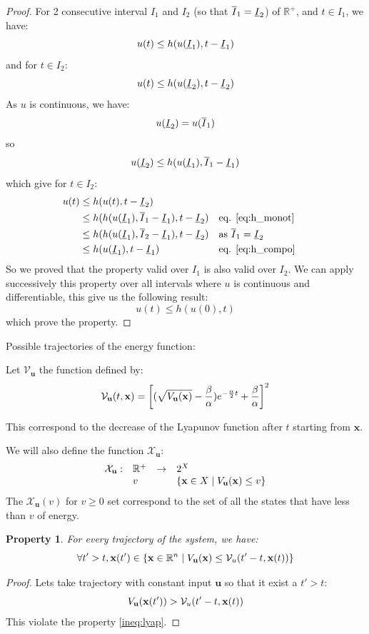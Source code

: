 \documentclass{article}
\newtheorem{property}{Property}
\theoremstyle{named}
\newcommand{\propsymbol}{\( \blacklozenge \)}
\newenvironment{prop}[0]
    {\begin{samepage}
    \begin{property}
    \renewcommand{\qedsymbol}{\propsymbol}\pushQED{\qed}
    }
    {
    \popQED %
    \end{property} 
    \end{samepage}
    }
\newcommand{\vect}[1]{\ensuremath{ \mathbf{#1}}}
\begin{document}
\begin{proof}
For 2 consecutive interval $I_1$ and $I_2$ (so that $\overline{I}_1 = \underline{I}_2$) of $\mathbb{R}^+$, and $t \in I_1$, we have:
$$u(t) \leq  h(u(\underline{I}_1),t-\underline{I}_1)$$
and for $t \in I_2$:
$$u(t) \leq  h(u(\underline{I}_2),t-\underline{I}_2)$$
As $u$ is continuous, we have:
$$u(\underline{I}_2) = u(\overline{I}_1)$$
so
$$u(\underline{I}_2) \leq h(u(\underline{I}_1),\overline{I}_1-\underline{I}_1)$$
which give for $t \in I_2$:
\begin{align*}
u(t) &\leq h(u(t),t-\underline{I}_2) \\
&\leq h(h(u(\underline{I}_1),\overline{I}_1-\underline{I}_1), t - \underline{I}_2) && \text{eq. \ref{eq:h_monot}}\\
&\leq h(h(u(\underline{I}_1),\overline{I}_2-\underline{I}_1), t - \underline{I}_2) && \text{as $\overline{I}_1=\underline{I}_2$}\\
& \leq h(u(\underline{I}_1), t - \underline{I}_1) && \text{eq. \ref{eq:h_compo} }
\end{align*}
So we proved that the property valid over $I_1$ is also valid over $I_2$.
We can apply successively this property over all intervals where $u$ is continuous and differentiable, this give us the following result:
$$u(t) \leq h(u(0),t)$$
which prove the property.
\end{proof}

Possible trajectories of the energy function:


\newcommand{\Vub}{\mathcal{V}_{\vect{u}}}
Let $\Vub$ the function defined by:
$$\Vub(t,\vect{x}) =  \left[ (\sqrt{\Vu(\vect{x})} - \frac{\beta}{\alpha}) e^{-\frac{\alpha}{2} t} + \frac{\beta}{\alpha} \right] ^2$$

This correspond to the decrease of the Lyapunov function after $t$ starting from $\vect{x}$.

\newcommand{\Xu}{\mathcal{X}_{\vect{u}}}
We will also define the function $\Xu$:
\begin{equation}
\begin{array}{llll}
\Xu:& \mathbb{R}^+ 	&\rightarrow 	& 2^X\\
	& v 				& 				& \{\vect{x} \in X \mid \Vu(\vect{x}) \leq v\}
\end{array}
\end{equation}
The $\Xu(v)$ for $v\geq0$ set correspond to the set of all the states that have less than $v$ of energy.


\begin{prop}
For every trajectory of the system, we have:
$$\forall t'>t,\vect{x}(t') \in \{\vect{x} \in \mathbb{R}^n \mid \Vu(\vect{x}) \leq \mathcal{V}_u(t'-t,\vect{x}(t))\}$$
\end{prop}

\begin{proof}
Lets take trajectory with constant input $\vect{u}$ so that it exist a $t'>t$:
$$\Vu(\vect{x}(t'))>\mathcal{V}_u(t'-t,\vect{x}(t))$$
This violate the property \ref{ineq:lyap}.
\end{proof}
\end{document}
